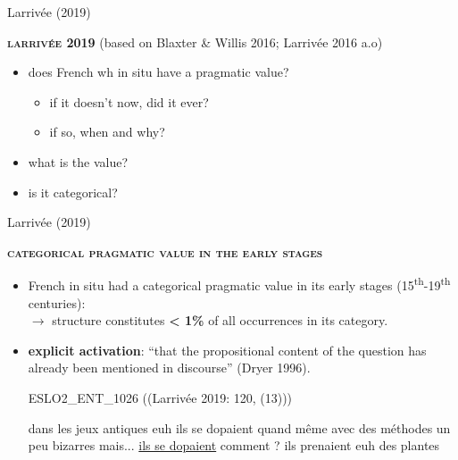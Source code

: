 \documentclass[lesson_slides]{subfiles}
\begin{document}
\begin{frame}[c]{Larrivée (2019)}

    \noindent \textbf{\textsc{larrivée 2019}} \pause (based on Blaxter \& Willis 2016; Larrivée 2016 a.o) \pause
    \begin{itemize}
        \item[\ding{227}] does French wh in situ have a pragmatic value? \pause
        \begin{itemize}
            \item if it doesn’t now, did it ever?
            \item if so, when and why?
        \end{itemize}
        \item[\ding{227}] what is the value? \pause
        \item[\ding{227}] is it categorical?
    \end{itemize}
  
\end{frame}
\begin{frame}[c]{Larrivée (2019)}

    \noindent \textbf{\textsc{categorical pragmatic value in the early stages}} \pause
    \begin{itemize}
        \item[\ding{227}] French in situ had a categorical pragmatic value in its early stages (15\textsuperscript{th}-19\textsuperscript{th} centuries):\\ \pause
        $\longrightarrow$ structure constitutes \textbf{< 1\%} of all occurrences in its category.
        \item[\ding{227}] \textbf{explicit activation}: \pause “that the propositional content of the question has already been mentioned in discourse” (Dryer 1996).\\ \pause
        \begin{exe}
        \ex ESLO2\_ENT\_1026 ((Larrivée 2019: 120, (13))) \pause
            \begin{xlist}
             dans les jeux antiques euh ils se dopaient quand même avec des	méthodes un peu bizarres mais... \pause
             \underline{ils se dopaient} comment ? \pause
             ils prenaient euh des plantes
            \end{xlist} 
            \end{exe}
    \end{itemize}
  
\end{frame}
\end{document}
